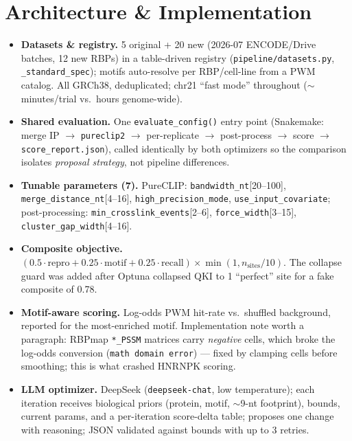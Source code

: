 \section{Architecture \& Implementation}
\label{method}

\begin{itemize}
  \item \textbf{Datasets \& registry.} 5 original + 20 new (2026-07 ENCODE/Drive batches, 12 new RBPs) in a table-driven registry (\texttt{pipeline/datasets.py}, \texttt{\_standard\_spec}); motifs auto-resolve per RBP/cell-line from a PWM catalog. All GRCh38, deduplicated; chr21 ``fast mode'' throughout ($\sim$minutes/trial vs.\ hours genome-wide).
  \item \textbf{Shared evaluation.} One \texttt{evaluate\_config()} entry point (Snakemake: merge IP $\rightarrow$ \texttt{pureclip2} $\rightarrow$ per-replicate $\rightarrow$ post-process $\rightarrow$ score $\rightarrow$ \texttt{score\_report.json}), called identically by both optimizers so the comparison isolates \emph{proposal strategy}, not pipeline differences.
  \item \textbf{Tunable parameters (7).} PureCLIP: \texttt{bandwidth\_nt}[20--100], \texttt{merge\_distance\_nt}[4--16], \texttt{high\_precision\_mode}, \texttt{use\_input\_covariate}; post-processing: \texttt{min\_crosslink\_events}[2--6], \texttt{force\_width}[3--15], \texttt{cluster\_gap\_width}[4--16].
  \item \textbf{Composite objective.} $(0.5\cdot\text{repro} + 0.25\cdot\text{motif} + 0.25\cdot\text{recall}) \times \min(1, n_{\text{sites}}/10)$. The collapse guard was added after Optuna collapsed QKI to 1 ``perfect'' site for a fake composite of 0.78.
  \item \textbf{Motif-aware scoring.} Log-odds PWM hit-rate vs.\ shuffled background, reported for the most-enriched motif. Implementation note worth a paragraph: RBPmap \texttt{*\_PSSM} matrices carry \emph{negative} cells, which broke the log-odds conversion (\texttt{math domain error}) --- fixed by clamping cells before smoothing; this is what crashed HNRNPK scoring.
  \item \textbf{LLM optimizer.} DeepSeek (\texttt{deepseek-chat}, low temperature); each iteration receives biological priors (protein, motif, $\sim$9-nt footprint), bounds, current params, and a per-iteration score-delta table; proposes one change with reasoning; JSON validated against bounds with up to 3 retries.

\end{itemize}
